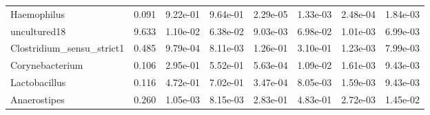 \begin{table}[!h]
\begin{tabular}[t]{lrllllll}
\addlinespace
Haemophilus & 0.091 & 9.22e-01 & 9.64e-01 & 2.29e-05 & 1.33e-03 & 2.48e-04 & 1.84e-03\\
uncultured18 & 9.633 & 1.10e-02 & 6.38e-02 & 9.03e-03 & 6.98e-02 & 1.01e-03 & 6.99e-03\\
Clostridium_sensu_strict1 & 0.485 & 9.79e-04 & 8.11e-03 & 1.26e-01 & 3.10e-01 & 1.23e-03 & 7.99e-03\\
Corynebacterium & 0.106 & 2.95e-01 & 5.52e-01 & 5.63e-04 & 1.09e-02 & 1.61e-03 & 9.43e-03\\
Lactobacillus & 0.116 & 4.72e-01 & 7.02e-01 & 3.47e-04 & 8.05e-03 & 1.59e-03 & 9.43e-03\\
\addlinespace
Anaerostipes & 0.260 & 1.05e-03 & 8.15e-03 & 2.83e-01 & 4.83e-01 & 2.72e-03 & 1.45e-02\\
\bottomrule
\end{tabular}
\end{table}

